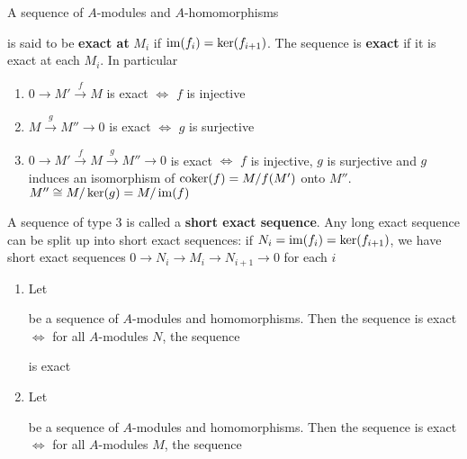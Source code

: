 \documentclass[11pt]{article}
\begin{document}
A sequence of \(A\)-modules and \(A\)-homomorphisms
\begin{center}\end{center}
is said to be \textbf{exact at} \(M_i\) if \(\operatorname{im}(f_i)=\ker(f_{i+1})\). The sequence is \textbf{exact} if it is exact
at each \(M_i\). In particular
\begin{enumerate}
\item \(0\to M'\xrightarrow{f}M\) is exact \(\Leftrightarrow\) \(f\) is injective
\item \(M\xrightarrow{g}M''\to 0\) is exact \(\Leftrightarrow\) \(g\) is surjective
\item \(0\to M'\xrightarrow{f}M\xrightarrow{g}M''\to 0\) is exact \(\Leftrightarrow\) \(f\) is injective, \(g\) is surjective and \(g\)
induces an isomorphism of \(\operatorname{coker}(f)=M/f(M')\) onto \(M''\).
\(M''\cong M/\ker(g)=M/\operatorname{im}(f)\)
\end{enumerate}


A sequence of type 3 is called a \textbf{short exact sequence}. Any long exact sequence can be split up
into short exact sequences: if \(N_i=\operatorname{im}(f_i)=\ker(f_{i+1})\), we have short exact
sequences \(0\to N_i\to M_i\to N_{i+1}\to 0\) for each \(i\)

\begin{proposition}[]
\begin{enumerate}
\item Let
\begin{center}\end{center}
be a sequence of \(A\)-modules and homomorphisms. Then the sequence is exact \(\Leftrightarrow\) for
all \(A\)-modules \(N\), the sequence
\begin{center}\end{center}
is exact
\item Let
\begin{center}\end{center}
be a sequence of \(A\)-modules and homomorphisms. Then the sequence is exact \(\Leftrightarrow\) for
all \(A\)-modules \(M\), the sequence
\begin{center}\end{center}
\end{enumerate}
\end{proposition}
\end{document}
